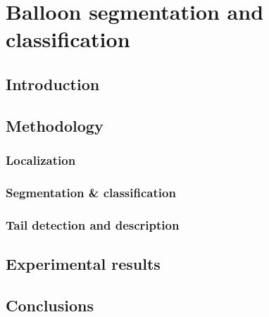 \chapter{Balloon segmentation and classification}
\label{chap:balloon_segmentation_and_classification}
\graphicspath{{./chapters/6-be/figs/}}

\section{Introduction}
\label{sec:be:introduction}


\section{Methodology}
\label{sec:be:methodology}

\subsection{Localization} %
\label{sub:be:localization}


\subsection{Segmentation \& classification} %
\label{sub:be:segmentation}


\subsection{Tail detection and description} %
\label{sub:be:tail_detection_and_description}


\section{Experimental results}
\label{sec:be:experimental_results}


\section{Conclusions}
\label{sec:be:conclusion}
